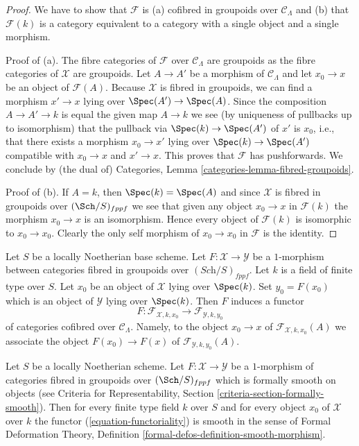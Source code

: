 \begin{proof}
We have to show that $\mathcal{F}$ is (a) cofibred in groupoids over
$\mathcal{C}_\Lambda$ and (b) that $\mathcal{F}(k)$ is a category equivalent
to a category with a single object and a single morphism.

\medskip\noindent
Proof of (a). The fibre categories of $\mathcal{F}$
over $\mathcal{C}_\Lambda$ are groupoids as the fibre categories
of $\mathcal{X}$ are groupoids. Let $A \to A'$ be a morphism of
$\mathcal{C}_\Lambda$ and let $x_0 \to x$ be an object of $\mathcal{F}(A)$.
Because $\mathcal{X}$ is fibred in groupoids, we can find a morphism
$x' \to x$ lying over $\Spec(A') \to \Spec(A)$. Since the composition
$A \to A' \to k$ is equal the given map $A \to k$ we see (by uniqueness
of pullbacks up to isomorphism) that the pullback via $\Spec(k) \to \Spec(A')$
of $x'$ is $x_0$, i.e., that there exists a morphism $x_0 \to x'$
lying over $\Spec(k) \to \Spec(A')$ compatible with
$x_0 \to x$ and $x' \to x$. This proves that $\mathcal{F}$ has
pushforwards. We conclude by (the dual of)
Categories, Lemma \ref{categories-lemma-fibred-groupoids}.

\medskip\noindent
Proof of (b). If $A = k$, then $\Spec(k) = \Spec(A)$ and since $\mathcal{X}$
is fibred in groupoids over $(\Sch/S)_{fppf}$ we see that given any object
$x_0 \to x$ in $\mathcal{F}(k)$ the morphism $x_0 \to x$ is an isomorphism.
Hence every object of $\mathcal{F}(k)$ is isomorphic to $x_0 \to x_0$.
Clearly the only self morphism of $x_0 \to x_0$ in $\mathcal{F}$ is
the identity.
\end{proof}

\noindent
Let $S$ be a locally Noetherian base scheme. Let
$F : \mathcal{X} \to \mathcal{Y}$ be a $1$-morphism between categories
fibred in groupoids over $(\textit{Sch}/S)_{fppf}$. Let $k$ is a field
of finite type over $S$. Let $x_0$ be an object of $\mathcal{X}$ lying
over $\Spec(k)$. Set $y_0 = F(x_0)$ which is an object of $\mathcal{Y}$
lying over $\Spec(k)$. Then $F$ induces a functor
\begin{equation}
\label{equation-functoriality}
F :
\mathcal{F}_{\mathcal{X}, k, x_0}
\longrightarrow
\mathcal{F}_{\mathcal{Y}, k, y_0}
\end{equation}
of categories cofibred over $\mathcal{C}_\Lambda$. Namely, to the object
$x_0 \to x$ of $\mathcal{F}_{\mathcal{X}, k, x_0}(A)$ we associate
the object $F(x_0) \to F(x)$ of $\mathcal{F}_{\mathcal{Y}, k, y_0}(A)$.

\begin{lemma}
\label{lemma-formally-smooth-on-deformation-categories}
Let $S$ be a locally Noetherian scheme. Let $F : \mathcal{X} \to \mathcal{Y}$
be a $1$-morphism of categories fibred in groupoids over $(\Sch/S)_{fppf}$
which is formally smooth on objects (see
Criteria for Representability, Section \ref{criteria-section-formally-smooth}).
Then for every finite type field $k$ over $S$ and for every object
$x_0$ of $\mathcal{X}$ over $k$ the functor (\ref{equation-functoriality})
is smooth in the sense of
Formal Deformation Theory, Definition
\ref{formal-defos-definition-smooth-morphism}.
\end{lemma}

